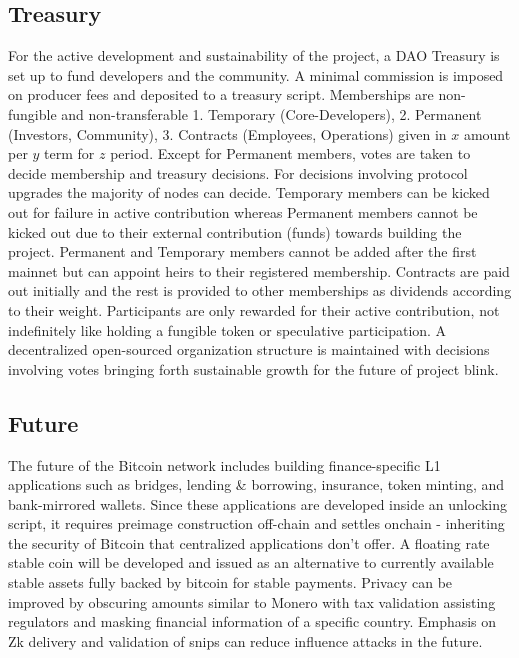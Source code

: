 \documentclass[a4paper,10pt]{article}
\begin{document}
\subsection{Treasury}

For the active development and sustainability of the project, a DAO Treasury is set up to fund developers and the community. A minimal commission is imposed on producer fees and deposited to a treasury script. Memberships are non-fungible and non-transferable 1. Temporary (Core-Developers), 2. Permanent (Investors, Community), 3. Contracts (Employees, Operations) given in $x$ amount per $y$ term for $z$ period. Except for Permanent members, votes are taken to decide membership and treasury decisions. For decisions involving protocol upgrades the majority of nodes can decide. Temporary members can be kicked out for failure in active contribution whereas Permanent members cannot be kicked out due to their external contribution (funds) towards building the project. Permanent and Temporary members cannot be added after the first mainnet but can appoint heirs to their registered membership. Contracts are paid out initially and the rest is provided to other memberships as dividends according to their weight. Participants are only rewarded for their active contribution, not indefinitely like holding a fungible token or speculative participation. A decentralized open-sourced organization structure is maintained with decisions involving votes bringing forth sustainable growth for the future of project blink.

\subsection{Future}

The future of the Bitcoin network includes building finance-specific L1 applications such as bridges, lending \& borrowing, insurance, token minting, and bank-mirrored wallets. Since these applications are developed inside an unlocking script, it requires preimage construction off-chain and settles onchain - inheriting the security of Bitcoin that centralized applications don't offer. A floating rate stable coin \cite{stablecoin} will be developed and issued as an alternative to currently available stable assets fully backed by bitcoin for stable payments. Privacy can be improved by obscuring amounts similar to Monero with tax validation assisting regulators and masking financial information of a specific country. Emphasis on Zk delivery and validation of snips can reduce influence attacks in the future. 
\end{document}
